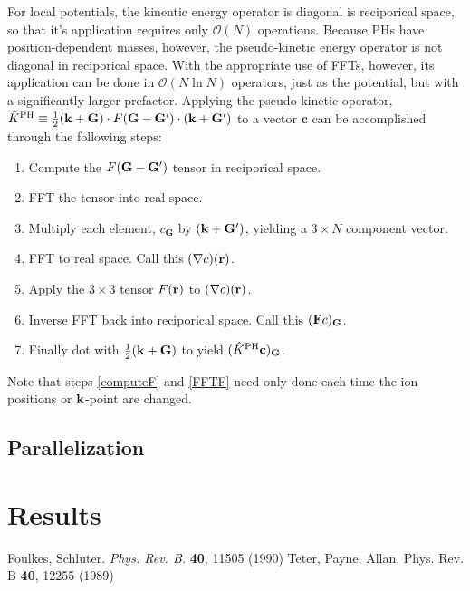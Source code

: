 \documentclass{article}
\begin{document}
For local potentials, the kinentic energy operator is diagonal is
reciporical space, so that it's application requires only
$\mathcal{O}(N)$ operations.  Because PHs have position-dependent
masses, however, the pseudo-kinetic energy operator is not diagonal in
reciporical space.  With the appropriate use of FFTs, however, its
application can be done in $\mathcal{O}(N \ln N)$ operators, just as
the potential, but with a significantly larger prefactor.  Applying
the pseudo-kinetic operator, $\hat{K}^\text{PH} \equiv \frac{1}{2}
(\mathbf{k} + \mathbf{G}) \cdot F(\mathbf{G}-\mathbf{G}')\cdot (\mathbf{k}+\mathbf{G'})$ to a vector
$\mathbf{c}$ can be accomplished through the following steps:
\begin{enumerate}
\item Compute the $F(\mathbf{G}-\mathbf{G'})$ tensor in reciporical space. \label{computeF}
\item FFT the tensor into real space. \label{FFTF}
\item Multiply each element, $c_\mathbf{G}$ by $(\mathbf{k} + \mathbf{G'})$, yielding
  a $3\times N$ component vector.
\item FFT to real space.  Call this $(\nabla c)(\mathbf{r})$.
\item Apply the $3\times 3$ tensor $F(\mathbf{r})$ to $(\nabla c)(\mathbf{r})$.
\item Inverse FFT back into reciporical space.  Call this
  $(\mathbf{F}c)_{\mathbf{G}}$.
\item Finally dot with $\frac{1}{2}(\mathbf{k} + \mathbf{G})$ to yield
  $(\hat{K}^\text{PH} \mathbf{c})_{\mathbf{G}}$. 
\end{enumerate}
Note that steps \ref{computeF} and \ref{FFTF} need only done each time
the ion positions or $\mathbf{k}$-point are changed.


\subsection{Parallelization}


\section{Results}

\begin{thebibliography}{9}
  Foulkes, Schluter. {\em Phys. Rev. B.} {\bf 40}, 11505 (1990)
 Teter, Payne, Allan. Phys. Rev. B {\bf 40}, 12255 (1989)

\end{thebibliography}
\end{document}
